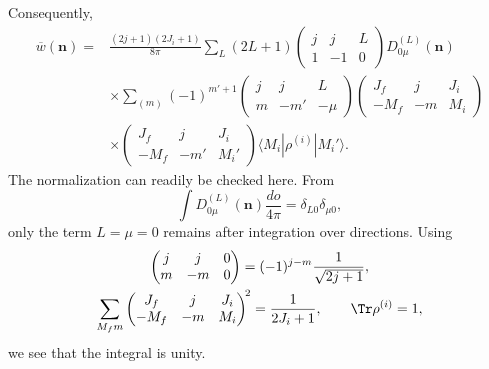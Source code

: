 Consequently,
\[
\begin{split}
\overline w(\mathbf n)={}&\frac{(2j+1)(2J_i+1)}{8\pi}
\sum_L(2L+1)\begin{pmatrix}j&j&L\\1&-1&0\end{pmatrix}D_{0\mu}^{(L)}(\mathbf n)\\
&\times\sum_{(m)}(-1)^{m'+1}
\begin{pmatrix}j&j&L\\m&-m'&-\mu\end{pmatrix}
\begin{pmatrix}J_f&j&J_i\\-M_f&-m&M_i\end{pmatrix}\\
&\times\begin{pmatrix}J_f&j&J_i\\-M_f&-m'&M_i'\end{pmatrix}
\langle M_i|\rho^{(i)}|M_i'\rangle .
\end{split}
\]
The normalization can readily be checked here. From
\[
\int D_{0\mu}^{(L)}(\mathbf n)\frac{do}{4\pi}=\delta_{L0}\delta_{\mu0},
\]
only the term $L=\mu=0$ remains after integration over directions. Using
\[
\begin{gathered}
\begin{pmatrix}j&j&0\\m&-m&0\end{pmatrix}
=(-1)^{j-m}\frac1{\sqrt{2j+1}},\\
\sum_{M_fm}\begin{pmatrix}J_f&j&J_i\\-M_f&-m&M_i\end{pmatrix}^{\!2}
=\frac1{2J_i+1},\qquad \Tr\rho^{(i)}=1,
\end{gathered}
\]
we see that the integral is unity.

